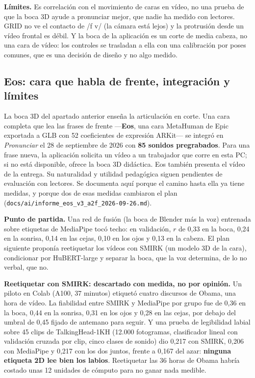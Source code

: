 \documentclass[11pt,a4paper]{article}
\newcommand{\cod}[1]{\texttt{\small #1}}
\begin{document}
\textbf{Límites.} Es correlación con el movimiento de caras en vídeo, no una prueba de que la
boca 3D ayude a pronunciar mejor, que nadie ha medido con lectores. GRID no ve el contacto de
/f v/ (la cámara está lejos) y la protrusión desde un vídeo frontal es débil. Y la boca de la
aplicación es un corte de media cabeza, no una cara de vídeo: los controles se trasladan a ella
con una calibración por poses comunes, que es una decisión de diseño y no algo medido.

\subsection{Eos: cara que habla de frente, integración y límites}
\label{sec:eos}

La boca 3D del apartado anterior enseña la articulación en corte. Una cara completa que lea
las frases de frente ---\textbf{Eos}, una cara MetaHuman de Epic exportada a GLB con 52
coeficientes de expresión ARKit--- se integró en \emph{Pronunciar} el 28 de septiembre
de 2026 con \textbf{85 sonidos pregrabados}. Para una frase nueva, la aplicación
solicita un vídeo a un trabajador que corre en esta PC; si no está disponible,
ofrece la boca 3D didáctica. Eos también presenta el vídeo de la entrega. Su
naturalidad y utilidad pedagógica siguen pendientes de evaluación con lectores.
Se documenta aquí porque el camino hasta ella ya tiene medidas, y
porque dos de esas medidas cambiaron el plan
(\cod{docs/ai/\allowbreak informe\_eos\_v3\_a2f\_2026-09-26.md}).

\textbf{Punto de partida.} Una red de fusión (la boca de Blender más la voz) entrenada sobre
etiquetas de MediaPipe tocó techo: en validación, $r$ de 0,33 en la boca, 0,24 en la sonrisa,
0,14 en las cejas, 0,10 en los ojos y 0,13 en la cabeza. El plan siguiente proponía
reetiquetar los vídeos con SMIRK (un modelo 3D de la cara), condicionar por HuBERT-large y
separar la boca, que la voz determina, de lo no verbal, que no.

\textbf{Reetiquetar con SMIRK: descartado con medida, no por opinión.} Un piloto en Colab
(A100, 37 minutos) etiquetó cuatro discursos de Obama, una hora de vídeo. La fiabilidad entre
SMIRK y MediaPipe por grupo fue de 0,36 en la boca, 0,44 en la sonrisa, 0,31 en los ojos y
0,28 en las cejas, por debajo del umbral de 0,45 fijado de antemano para seguir. Y una prueba
de legibilidad labial sobre 45 clips de TalkingHead-1KH (12.000 fotogramas, clasificador
lineal con validación cruzada por clip, cinco clases de sonido) dio 0,217 con SMIRK, 0,206 con
MediaPipe y 0,217 con los dos juntos, frente a 0,167 del azar: \textbf{ninguna etiqueta 2D lee
bien los labios}. Reetiquetar las 36 horas de Obama habría costado unas 12 unidades de cómputo
para no ganar nada medible.
\end{document}

